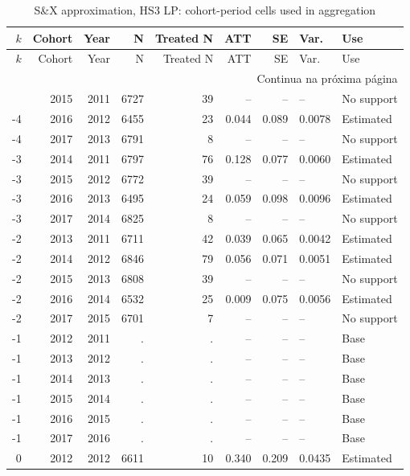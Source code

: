 ﻿\begingroup
\tiny
\setlength{\tabcolsep}{2.2pt}
\renewcommand{\arraystretch}{0.82}
\begin{longtable}{rrrrrrrll}
\caption{S\&X approximation, HS3 LP: cohort-period cells used in aggregation}
\label{tab:ap_sx_celulas_HS3_lp}\\
\toprule
\(k\) & Cohort & Year & N & Treated N & ATT & SE & Var. & Use \\
\midrule
\endfirsthead
\toprule
\(k\) & Cohort & Year & N & Treated N & ATT & SE & Var. & Use \\
\midrule
\endhead
\midrule
\multicolumn{9}{r}{Continua na próxima página} \\
\endfoot
\bottomrule
\endlastfoot
-4 & 2015 & 2011 & 6727 & 39 & -- & -- & -- & No support \\
-4 & 2016 & 2012 & 6455 & 23 & 0.044 & 0.089 & 0.0078 & Estimated \\
-4 & 2017 & 2013 & 6791 & 8 & -- & -- & -- & No support \\
-3 & 2014 & 2011 & 6797 & 76 & 0.128 & 0.077 & 0.0060 & Estimated \\
-3 & 2015 & 2012 & 6772 & 39 & -- & -- & -- & No support \\
-3 & 2016 & 2013 & 6495 & 24 & 0.059 & 0.098 & 0.0096 & Estimated \\
-3 & 2017 & 2014 & 6825 & 8 & -- & -- & -- & No support \\
-2 & 2013 & 2011 & 6711 & 42 & 0.039 & 0.065 & 0.0042 & Estimated \\
-2 & 2014 & 2012 & 6846 & 79 & 0.056 & 0.071 & 0.0051 & Estimated \\
-2 & 2015 & 2013 & 6808 & 39 & -- & -- & -- & No support \\
-2 & 2016 & 2014 & 6532 & 25 & 0.009 & 0.075 & 0.0056 & Estimated \\
-2 & 2017 & 2015 & 6701 & 7 & -- & -- & -- & No support \\
-1 & 2012 & 2011 & . & . & -- & -- & -- & Base \\
-1 & 2013 & 2012 & . & . & -- & -- & -- & Base \\
-1 & 2014 & 2013 & . & . & -- & -- & -- & Base \\
-1 & 2015 & 2014 & . & . & -- & -- & -- & Base \\
-1 & 2016 & 2015 & . & . & -- & -- & -- & Base \\
-1 & 2017 & 2016 & . & . & -- & -- & -- & Base \\
0 & 2012 & 2012 & 6611 & 10 & 0.340 & 0.209 & 0.0435 & Estimated \\

\end{longtable}
